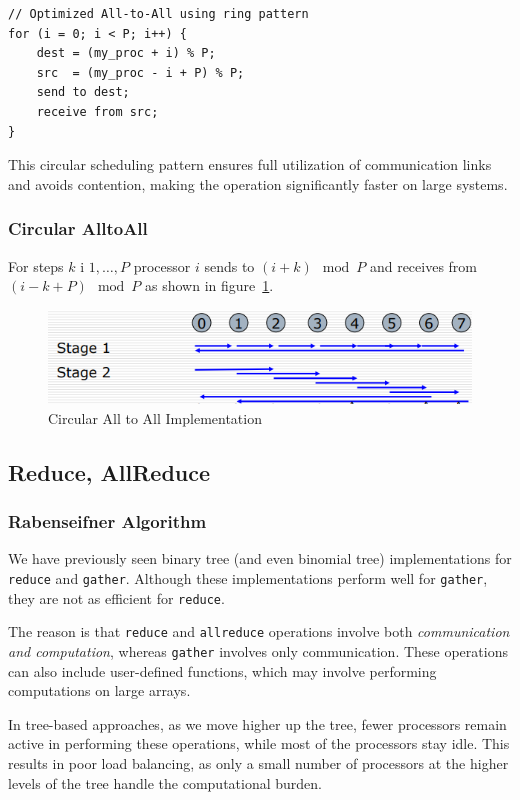 \documentclass[12pt]{book}
\begin{document}
\begin{lstlisting}[style=cppstyle]
// Optimized All-to-All using ring pattern
for (i = 0; i < P; i++) {
    dest = (my_proc + i) % P;
    src  = (my_proc - i + P) % P;
    send to dest;
    receive from src;
}
\end{lstlisting}

This circular scheduling pattern ensures full utilization of communication links and avoids contention, making the operation significantly faster on large systems.

\subsubsection{Circular AlltoAll}
For steps $k$ i ${1,\ldots,P}$ processor $i$ sends to $(i+k) \mod P$ and receives from $(i-k+P)\mod P$ as shown in figure~\ref{fig:circalltoall}.
\begin{figure}
    \centering
    \includegraphics[width=0.5\linewidth]{images/circalltoall.png}
    \caption{Circular All to All Implementation}
    \label{fig:circalltoall}
\end{figure}
\subsection{Reduce, AllReduce}

\subsubsection{Rabenseifner Algorithm}
We have previously seen binary tree (and even binomial tree) implementations for \texttt{reduce} 
and \texttt{gather}. Although these implementations perform well for \texttt{gather}, 
they are not as efficient for \texttt{reduce}. 

The reason is that \texttt{reduce} and \texttt{allreduce} operations involve both 
\emph{communication and computation}, whereas \texttt{gather} involves only communication. 
These operations can also include user-defined functions, which may involve performing 
computations on large arrays. 

In tree-based approaches, as we move higher up the tree, fewer processors remain 
active in performing these operations, while most of the processors stay idle. 
This results in poor load balancing, as only a small number of processors at the 
higher levels of the tree handle the computational burden.
\end{document}
